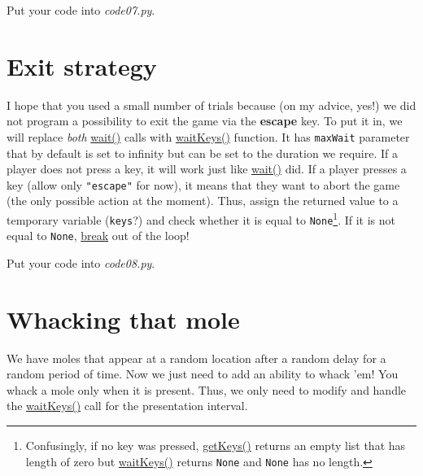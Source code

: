 \documentclass[
]{book}
\begin{document}
Put your code into \emph{code07.py}.

\hypertarget{waitKeys-maxwait}{%
\section{Exit strategy}\label{waitKeys-maxwait}}

I hope that you used a small number of trials because (on my advice, yes!) we did not program a possibility to exit the game via the \textbf{escape} key. To put it in, we will replace \emph{both} \href{https://psychopy.org/api/clock.html\#psychopy.clock.wait}{wait()} calls with \href{https://psychopy.org/api/event.html\#psychopy.event.waitKeys}{waitKeys()} function. It has \texttt{maxWait} parameter that by default is set to infinity but can be set to the duration we require. If a player does not press a key, it will work just like \href{https://psychopy.org/api/clock.html\#psychopy.clock.wait}{wait()} did. If a player presses a key (allow only \texttt{"escape"} for now), it means that they want to abort the game (the only possible action at the moment). Thus, assign the returned value to a temporary variable (\texttt{keys}?) and check whether it is equal to \texttt{None}\footnote{Confusingly, if no key was pressed, \href{https://psychopy.org/api/event.html\#psychopy.event.getKeys}{getKeys()} returns an empty list that has length of zero but \href{https://psychopy.org/api/event.html\#psychopy.event.waitKeys}{waitKeys()} returns \texttt{None} and \texttt{None} has no length.}. If it is not equal to \texttt{None}, \protect\hyperlink{break}{break} out of the loop!

Put your code into \emph{code08.py}.

\hypertarget{whacking-that-mole}{%
\section{Whacking that mole}\label{whacking-that-mole}}

We have moles that appear at a random location after a random delay for a random period of time. Now we just need to add an ability to whack 'em! You whack a mole only when it is present. Thus, we only need to modify and handle the \href{https://psychopy.org/api/event.html\#psychopy.event.waitKeys}{waitKeys()} call for the presentation interval.
\end{document}
